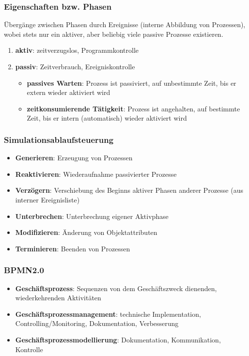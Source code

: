 \documentclass{article}
\begin{document}
\subsubsection{Eigenschaften bzw. Phasen}
Übergänge zwischen Phasen durch Ereignisse (interne Abbildung von Prozessen), wobei stets nur ein aktiver, aber beliebig viele passive Prozesse existieren.
\begin{enumerate}
  \item \textbf{aktiv}: zeitverzugslos, Programmkontrolle
  \item \textbf{passiv}: Zeitverbrauch, Ereigniskontrolle
        \begin{itemize}
          \item \textbf{passives Warten}: Prozess ist passiviert, auf unbestimmte Zeit, bis er extern wieder aktiviert wird
          \item \textbf{zeitkonsumierende Tätigkeit}: Prozess ist angehalten, auf bestimmte Zeit, bis er intern (automatisch) wieder aktiviert wird
        \end{itemize}
\end{enumerate}

\subsubsection{Simulationsablaufsteuerung}
\begin{itemize}
  \item \textbf{Generieren}: Erzeugung von Prozessen
  \item \textbf{Reaktivieren}: Wiederaufnahme passivierter Prozesse
  \item \textbf{Verzögern}: Verschiebung des Beginns aktiver Phasen anderer Prozesse (aus interner Ereignisliste)
  \item \textbf{Unterbrechen}: Unterbrechung eigener Aktivphase
  \item \textbf{Modifizieren}: Änderung von Objektattributen
  \item \textbf{Terminieren}: Beenden von Prozessen
\end{itemize}

\subsubsection{BPMN2.0}
\begin{itemize}
  \item \textbf{Geschäftsprozess}: Sequenzen von dem Geschäftszweck dienenden, wiederkehrenden Aktivitäten
  \item \textbf{Geschäftsprozessmanagement}: technische Implementation, Controlling/Monitoring, Dokumentation, Verbesserung
  \item \textbf{Geschäftsprozessmodellierung}: Dokumentation, Kommunikation, Kontrolle
\end{itemize}
\end{document}
